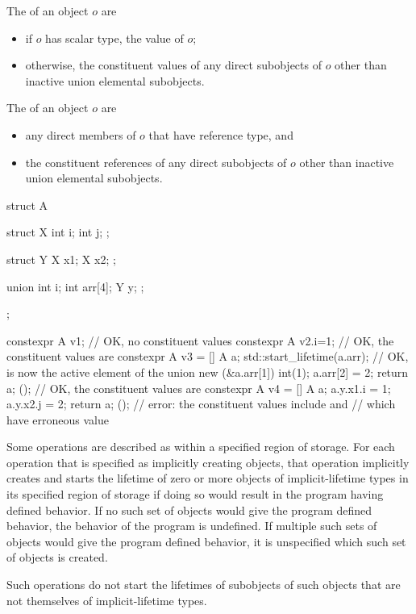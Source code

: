 \pnum
The  of an object $o$ are
\begin{itemize}
\item
if $o$ has scalar type, the value of $o$;
\item
otherwise, the constituent values of any direct subobjects of $o$
other than inactive union elemental subobjects.
\end{itemize}
The  of an object $o$ are
\begin{itemize}
\item
any direct members of $o$ that have reference type, and
\item
the constituent references of any direct subobjects of $o$
other than inactive union elemental subobjects.
\end{itemize}
\begin{example}
\begin{codeblock}
struct A {
  struct X {
    int i;
    int j;
  };

  struct Y {
    X x1;
    X x2;
  };

  union {
    int i;
    int arr[4];
    Y y;
  };
};

constexpr A v1;         // OK, no constituent values
constexpr A v2{.i=1};   // OK, the constituent values are 
constexpr A v3 = []{
  A a;
  std::start_lifetime(a.arr);   // OK,  is now the active element of the union
  new (&a.arr[1]) int(1);
  a.arr[2] = 2;
  return a;
}();                    // OK, the constituent values are 
constexpr A v4 = []{
  A a;
  a.y.x1.i = 1;
  a.y.x2.j = 2;
  return a;
}();                    // error: the constituent values include  and 
                        // which have erroneous value
\end{codeblock}
\end{example}

\pnum
Some operations are described as
within a specified region of storage.
For each operation that is specified as implicitly creating objects,
that operation implicitly creates and starts the lifetime of
zero or more objects of implicit-lifetime types
in its specified region of storage
if doing so would result in the program having defined behavior.
If no such set of objects would give the program defined behavior,
the behavior of the program is undefined.
If multiple such sets of objects would give the program defined behavior,
it is unspecified which such set of objects is created.
\begin{note}
Such operations do not start the lifetimes of subobjects of such objects
that are not themselves of implicit-lifetime types.
\end{note}

